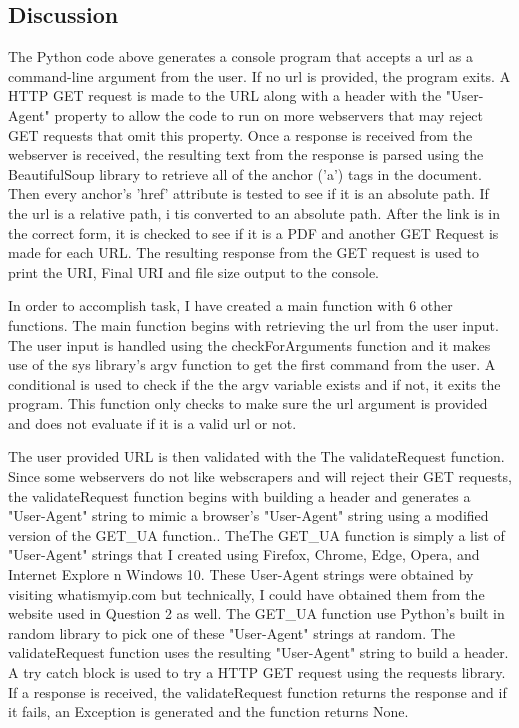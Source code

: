 \documentclass[12pt]{article}
\begin{document}
\subsection*{Discussion}

The Python code above generates a console program that accepts a url as a command-line argument from the user. If no url is provided, the program exits. A HTTP GET request is made to the URL along with a header with the "User-Agent" property to allow the code to run on more webservers that may reject GET requests that omit this property. Once a response is received from the webserver is received, the resulting text from the response is parsed using the BeautifulSoup library to retrieve all of the anchor ('a') tags in the document. Then every anchor's 'href' attribute is tested to see if it is an absolute path. If the url is a relative path, i tis converted to an absolute path. After the link is in the correct form, it is checked to see if it is a PDF and another GET Request is made for each URL. The resulting response from the GET request is used to print the URI, Final URI and file size output to the console. 

In order to accomplish task, I have created a main function with 6 other functions. The main function begins with retrieving the url  from the user input. The user input is handled using the checkForArguments function and it makes use of the sys library's argv function to get the first command from the user. A conditional is used to check if the the argv variable exists and if not, it exits the program. This function only checks to make sure the url argument is provided and does not evaluate if it is a valid url or not.

The user provided URL is then validated with the The validateRequest function. Since some webservers do not like webscrapers and will reject their GET requests, the validateRequest function begins with building a header and generates a "User-Agent" string to mimic a browser's "User-Agent" string using a modified version of the GET\_UA function.\cite{randomizeUserAgent}. TheThe GET\_UA function is simply a list of "User-Agent" strings that I created using Firefox, Chrome, Edge, Opera, and Internet Explore n Windows 10. These User-Agent strings were obtained by visiting whatismyip.com \cite{whatIsMyIp} but technically, I could have obtained them from the website used in Question 2 as well. The GET\_UA  function use Python's built in random library to pick one of these "User-Agent" strings at random. The validateRequest function uses the resulting "User-Agent" string to build a header. A try catch block is used to try a HTTP GET request using the requests library. If a response is received, the validateRequest function returns the response and if it fails, an Exception is generated and the function returns None. 
\end{document}
